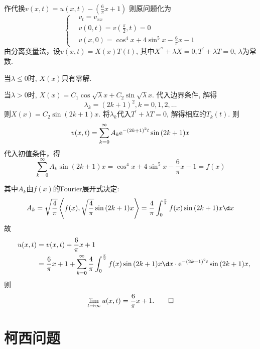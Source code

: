 \begin{solve}
	作代换$v(x,t)=u(x,t)-(\frac{6}{\pi}x+1)$
	则原问题化为
	$$\begin{cases}&v_t=v_{xx}\\&v(0,t)=v(\frac{\pi}{2},t)=0\\&v(x,0)=\cos^4x+4\sin^5x-\frac{6}{\pi}x-1\end{cases}$$
	由分离变量法，设$v(x,t)=X(x)T(t)$, 其中$X^{\prime\prime}+\lambda X=0, T^{\prime}+\lambda T=0$, $\lambda$为常数.
	
	当$\lambda\leq0$时, $X(x)$只有零解.
	
	当$\lambda>0$时, $X(x)=C_1\cos\sqrt{\lambda}x+C_2\sin\sqrt{\lambda}x$.
	代入边界条件, 解得
	$$\lambda_{k}=(2k+1)^{2}, k=0,1,2,\ldots$$
	则$X(x)=C_{2}\sin{(2k+1)}x$.
	将$\lambda_k$代入$T^\prime+\lambda T=0$, 解得相应的$T_k(t)$. 则
	\[v(x,t)=\sum_{k=0}^{\infty}A_{k}\mathrm{e}^{-(2k+1)^{2}t}\sin{(2k+1)x}\]
	代入初值条件，得
	$$\sum_{k=0}^\infty A_k\sin{(2k+1)x}=\cos^4x+4\sin^5x-\frac6\pi x-1=f(x)$$
	
	其中$A_k$由$f(x)$的Fourier展开式决定:
	\[A_{k} =\sqrt{\frac4\pi}\left\langle f(x),\sqrt{\frac4\pi}\sin{(2k+1)x}\right\rangle =\frac4\pi\int_0^{\frac\pi2}f(x)\sin{(2k+1)x}\d x\]
	故
	\[\begin{aligned}&&u(x,t)& =v(x,t)+\frac6\pi x+1 \\
	&&&=\frac6\pi x+1+\sum_{k=0}^\infty\frac4\pi\int_0^{\frac\pi2}f(x)\sin{(2k+1)x}\d x\cdot \e^{-(2k+1)^2t}\sin{(2k+1)x},
	\end{aligned}\]
	则
	\[\lim_{t\to\infty}u(x,t)=\frac{6}{\pi}x+1.\qedhere\]
\end{solve}
\section{柯西问题}

